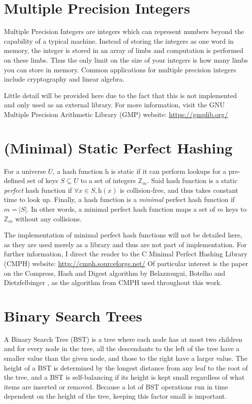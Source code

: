 \documentclass[ %
                    author={Dominic Joseph Moylett},
                    degree={MEng},
                     title={Dictionary Matching with Fingerprints},
                  subtitle={An Empirical Analysis},
                      type={research},
                      year={2015} ]{dissertation}
\begin{document}
\section{Multiple Precision Integers}

Multiple Precision Integers are integers which can represent numbers beyond the capability of a typical machine. Instead of storing the integers as one word in memory, the integer is stored in an array of limbs and computation is performed on these limbs. Thus the only limit on the size of your integers is how many limbs you can store in memory. Common applications for multiple precision integers include cryptography and linear algebra.

Little detail will be provided here due to the fact that this is not implemented and only used as an external library. For more information, visit the GNU Multiple Precision Arithmetic Library (GMP) website: \url{https://gmplib.org/}

\section{(Minimal) Static Perfect Hashing}
\label{min-perf-hash}

For a universe $U$, a hash function $\text{h}$ is static if it can perform lookups for a pre-defined set of keys $S \subseteq U$ to a set of integers $\mathbb{Z}_m$. Said hash function is a static \textit{perfect} hash function if $\forall x \in S, \text{h}(x)$ is collision-free, and thus takes constant time to look up. Finally, a hash function is a \textit{minimal} perfect hash function if $m = |S|$. In other words, a minimal perfect hash function maps a set of $m$ keys to $\mathbb{Z}_m$ without any collisions.

The implementation of minimal perfect hash functions will not be detailed here, as they are used merely as a library and thus are not part of implementation. For further information, I direct the reader to the C Minimal Perfect Hashing Library (CMPH) website: \url{http://cmph.sourceforge.net/} Of particular interest is the paper on the Compress, Hash and Digest algorithm by Belazzougui, Botelho and Dietzfelbinger \cite{belazzougui:chd}, as the algorithm from CMPH used throughout this work.

\section{Binary Search Trees}
A Binary Search Tree (BST) \cite[pp 286-298]{clrs} is a tree where each node has at most two children and for every node in the tree, all the descendants to the left of the tree have a smaller value than the given node, and those to the right have a larger value. The height of a BST is determined by the longest distance from any leaf to the root of the tree, and a BST is self-balancing if its height is kept small regardless of what items are inserted or removed. Because a lot of BST operations run in time dependent on the height of the tree, keeping this factor small is important.
\end{document}
